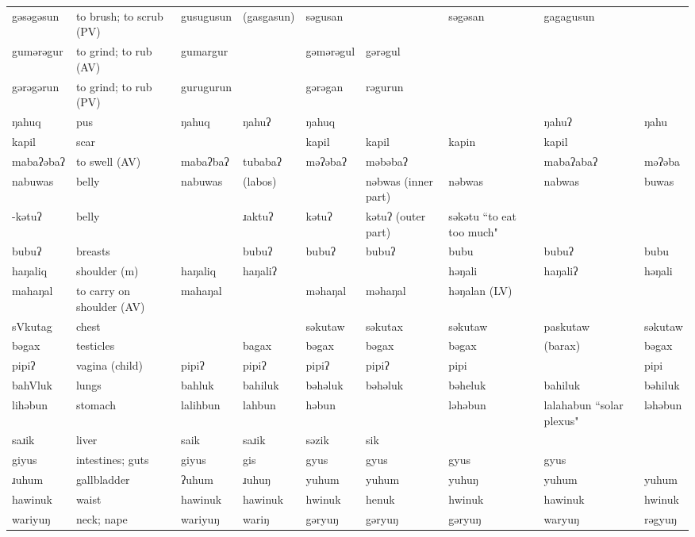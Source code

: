 \begin{landscape}
\begin{longtable}{*{9}{>{\raggedright\arraybackslash}p{}}}
\text{*}gəsəgəsun & to brush; to scrub (PV) & gusugusun & (gasgasun) & səgusan &  & səgəsan & gagagusun & \\
\text{*}gumərəgur & to grind; to rub (AV) & gumargur &  & gəmərəgul & gərəgul &  &  & \\
\text{*}gərəgərun & to grind; to rub (PV) & gurugurun &  & gərəgan & rəgurun &  &  & \\
\text{*}ŋahuq & pus & ŋahuq & ŋahuʔ & ŋahuq &  &  & ŋahuʔ & ŋahu\\
\text{*}kapil & scar &  &  & kapil & kapil & kapin & kapil & \\
\text{*}mabaʔəbaʔ & to swell (AV) & mabaʔbaʔ & tubabaʔ & məʔəbaʔ & məbəbaʔ &  & mabaʔabaʔ & məʔəba\\
\text{*}nabuwas & belly & nabuwas & (labos) &  & nəbwas (inner part) & nəbwas & nabwas & buwas\\
\text{*}-kətuʔ & belly &  & ɹaktuʔ & kətuʔ & kətuʔ (outer part) & səkətu ``to eat too much" &  & \\
\text{*}bubuʔ & breasts &  & bubuʔ & bubuʔ & bubuʔ & bubu & bubuʔ & bubu\\
\text{*}haŋaliq & shoulder (m) & haŋaliq & haŋaliʔ &  &  & həŋali & haŋaliʔ & həŋali\\
\text{*}mahaŋal & to carry on shoulder (AV) & mahaŋal &  & məhaŋal & məhaŋal & həŋalan (LV) &  & \\
\text{*}sVkutag & chest &  &  & səkutaw & səkutax & səkutaw & paskutaw & səkutaw\\
\text{*}bəgax & testicles &  & bagax & bəgax & bəgax & bəgax & (barax) & bəgax\\
\text{*}pipiʔ & vagina (child) & pipiʔ & pipiʔ & pipiʔ & pipiʔ & pipi &  & pipi\\
\text{*}bahVluk & lungs & bahluk & bahiluk & bəhəluk & bəhəluk & bəheluk & bahiluk & bəhiluk\\
\text{*}lihəbun & stomach & lalihbun & lahbun & həbun &  & ləhəbun & lalahabun \newline ``solar plexus" & ləhəbun\\
\text{*}saɹik & liver & saik & saɹik & səzik & sik &  &  & \\
\text{*}giyus & intestines; guts & giyus & gis & gyus & gyus & gyus & gyus & \\
\text{*}ɹuhum & gallbladder & ʔuhum & ɹuhuŋ & yuhum & yuhum & yuhuŋ & yuhum & yuhum\\
\text{*}hawinuk & waist & hawinuk & hawinuk & hwinuk & henuk & hwinuk & hawinuk & hwinuk\\
\text{*}wariyuŋ & neck; nape & wariyuŋ & wariŋ & gəryuŋ & gəryuŋ & gəryuŋ & waryuŋ & rəgyuŋ\\

\end{longtable}
\end{landscape}
